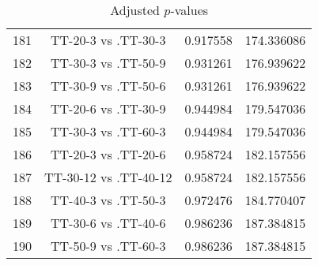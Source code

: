\documentclass[a4paper,10pt]{article}
\begin{document}
\begin{landscape}
\begin{table}[!htp]
\begin{tabular}{cccc}
181&TT-20-3 vs .TT-30-3&0.917558&174.336086\\
182&TT-30-3 vs .TT-50-9&0.931261&176.939622\\
183&TT-30-9 vs .TT-50-6&0.931261&176.939622\\
184&TT-20-6 vs .TT-30-9&0.944984&179.547036\\
185&TT-30-3 vs .TT-60-3&0.944984&179.547036\\
186&TT-20-3 vs .TT-20-6&0.958724&182.157556\\
187&TT-30-12 vs .TT-40-12&0.958724&182.157556\\
188&TT-40-3 vs .TT-50-3&0.972476&184.770407\\
189&TT-30-6 vs .TT-40-6&0.986236&187.384815\\
190&TT-50-9 vs .TT-60-3&0.986236&187.384815\\
\hline
\end{tabular}
\caption{Adjusted $p$-values}
\end{table}

\end{landscape}
\end{document}
